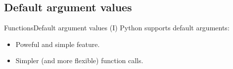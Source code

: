 \documentclass[10pt,compress]{beamer} %
\begin{document}

\subsection{Default argument values}
\begin{frame}{Functions}{Default argument values (I)}
	Python supports default arguments:
		\begin{itemize}
		\item Poweful and simple feature.
		\item Simpler (and more flexible) function calls.
		\end{itemize}
		\vspace{-0.2cm}
    \begin{columns}
    \column{\textwidth}
		\begin{block}{}
		\vspace{-0.2cm}
		
		\vspace{-0.2cm}
		\end{block}
	\end{columns}
\end{frame}
\end{document}
